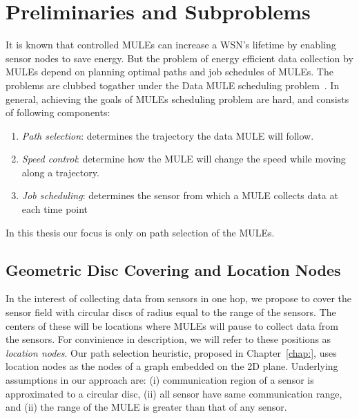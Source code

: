 \chapter{Preliminaries and Subproblems}
\label{chap:location_nodes}


It is known that controlled MULEs can increase a WSN's lifetime by enabling sensor nodes to save energy. But the problem of energy efficient data collection by MULEs depend on planning optimal paths and job schedules of MULEs. The problems are clubbed togather under the Data MULE scheduling problem~\cite{dms}. In general, achieving the goals of MULEs scheduling problem are 
hard, and consists of following components: 
\begin{enumerate}
  \item {\em Path selection}: determines the trajectory the data MULE 
    will follow.
\item {\em Speed control}: determine how the MULE will change the speed
  while moving along a trajectory. 
\item {\em Job scheduling}: determines the sensor from which a MULE collects data at each time point
\end{enumerate}
In this thesis our focus is only on path selection of the MULEs.

\section{Geometric Disc Covering and Location Nodes}

In the interest of collecting data from sensors in one hop, we propose to cover the sensor field with circular discs of radius equal to the range of the sensors. The centers of these will be locations where MULEs will pause to collect data from the sensors. For convinience in description, we will refer to these positions as \emph{location nodes}. Our path selection heuristic, proposed in Chapter~\ref{chap:}, uses location nodes as the nodes of a graph embedded on the 2D plane. Underlying assumptions in our approach are: (i) communication region of a sensor is approximated to a circular disc, (ii) all sensor have same communication range, and (ii) the range of the MULE is greater than that of any sensor. %

